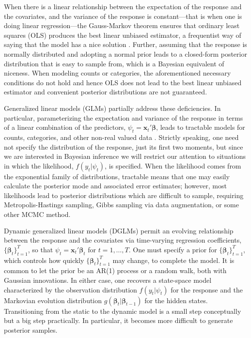 \documentclass[12pt]{article}
\newcommand{\bbeta}{\boldsymbol{\beta}}
\newcommand{\vx}{\boldsymbol{x}}
\newcounter{parnum}
\newcommand{\npoint}{%
  \noindent\refstepcounter{parnum}%
  \makebox[0.5in][c]{\textbf{\arabic{parnum}.}} %
  \marginnote{\small\ttfamily\the\inputlineno}}
\renewcommand{\npoint}{}
\begin{document}
\npoint When there is a linear relationship between the expectation of the response and
the covariates, and the variance of the response is constant---that is when one
is doing linear regression---the Gauss-Markov theorem ensures that ordinary
least squares (OLS) produces the best linear unbiased estimator, a frequentist
way of saying that the model has a nice solution \citep{christensen-book-2001}.
\npoint Further, assuming that the response is normally distributed and adopting a
normal prior leads to a closed-form posterior distribution that is easy to
sample from, which is a Bayesian equivalent of niceness.  When modeling counts
or categories, the aforementioned necessary conditions do not hold and hence OLS
does not lead to the best linear unbiased estimator and convenient posterior
distributions are not guaranteed.

\npoint Generalized linear models (GLMs) partially address these deficiencies.
In particular, parameterizing the expectation and variance of the response in
terms of a linear combination of the predictors, $\psi_t = \vx_t' \bbeta$, leads
to tractable models for counts, categories, and other non-real valued data
\citep{mccullagh-nelder-1989, wedderburn-1974}.  Strictly speaking, one need not
specify the distribution of the response, just its first two moments, but since
we are interested in Bayesian inference we will restrict our attention to
situations in which the likelihood, $f(y_t | \psi_t)$, is specified.  When the
likelihood comes from the exponential family of distributions, tractable means
that one may easily calculate the posterior mode and associated error estimates;
however, most likelihoods lead to posterior distributions which are difficult to
sample, requiring Metropolis-Hastings sampling, Gibbs sampling via data
augmentation, or some other MCMC method.

\npoint Dynamic generalized linear models (DGLMs) permit an evolving
relationship between the response and the covariates via time-varying regression
coefficients, $\{\bbeta_t\}_{t=1}^T$, so that $\psi_t = \vx_t' \bbeta_t$ for
$t=1, \ldots, T$.  One must specify a prior for $\{\bbeta_t\}_{t=1}^T$, which
controls how quickly $\{\bbeta_t\}_{t=1}^T$ may change, to complete the model.
It is common to let the prior be an AR(1) process or a random walk, both with
Gaussian innovations.  In either case, one recovers a state-space model
characterized by the observation distribution $f(y_t | \psi_t)$ for the response
and the Markovian evolution distribution $g(\bbeta_t | \bbeta_{t-1})$ for the
hidden states.  Transitioning from the static to the dynamic model is a small
step conceptually but a big step practically.  In particular, it becomes more
difficult to generate posterior samples.
\end{document}
